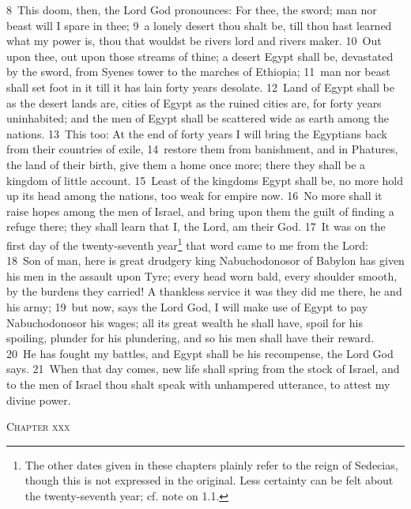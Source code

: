 \documentclass[10pt]{book} %
\begin{document}
\textcolor{benred8}{8}~This doom, then, the Lord God pronounces: For thee, the sword; man nor beast will I spare in thee; \textcolor{benred8}{9}~a lonely desert thou shalt be, till thou hast learned what my power is, thou that wouldst be river\textquotesingle s lord and river\textquotesingle s maker. \textcolor{benred8}{10}~Out upon thee, out upon those streams of thine; a desert Egypt shall be, devastated by the sword, from Syene\textquotesingle s tower to the marches of Ethiopia; \textcolor{benred8}{11}~man nor beast shall set foot in it till it has lain forty years desolate. \textcolor{benred8}{12}~Land of Egypt shall be as the desert lands are, cities of Egypt as the ruined cities are, for forty years uninhabited; and the men of Egypt shall be scattered wide as earth among the nations.
\textcolor{benred8}{13}~This too: At the end of forty years I will bring the Egyptians back from their countries of exile, \textcolor{benred8}{14}~restore them from banishment, and in Phatures, the land of their birth, give them a home once more; there they shall be a kingdom of little account. \textcolor{benred8}{15}~Least of the kingdoms Egypt shall be, no more hold up its head among the nations, too weak for empire now. \textcolor{benred8}{16}~No more shall it raise hopes among the men of Israel, and bring upon them the guilt of finding a refuge there; they shall learn that I, the Lord, am their God.
\textcolor{benred8}{17}~It was on the first day of the twenty-seventh year\footnote[3]{The other dates given in these chapters plainly refer to the reign of Sedecias, though this is not expressed in the original. Less certainty can be felt about the \textasciigrave twenty-seventh year\textquotesingle ; cf. note on 1.1.} that word came to me from the Lord: \textcolor{benred8}{18}~Son of man, here is great drudgery king Nabuchodonosor of Babylon has given his men in the assault upon Tyre; every head worn bald, every shoulder smooth, by the burdens they carried! A thankless service it was they did me there, he and his army; \textcolor{benred8}{19}~but now, says the Lord God, I will make use of Egypt to pay Nabuchodonosor his wages; all its great wealth he shall have, spoil for his spoiling, plunder for his plundering, and so his men shall have their reward. \textcolor{benred8}{20}~He has fought my battles, and Egypt shall be his recompense, the Lord God says. \textcolor{benred8}{21}~When that day comes, new life shall spring from the stock of Israel, and to the men of Israel thou shalt speak with unhampered utterance, to attest my divine power.
\begin{large}\begin{center}\textsc{Chapter xxx}\end{center}\end{large}
\end{document}

